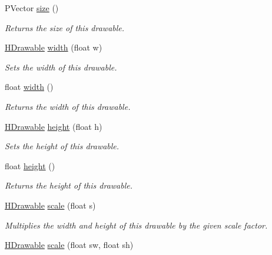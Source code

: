 \begin{DoxyCompactItemize}
P\-Vector \hyperlink{classhype_1_1core_1_1drawable_1_1_h_drawable_a91deb3e8a0b504c602670764733a744f}{size} ()
\begin{DoxyCompactList}\small\item\em Returns the size of this drawable. \end{DoxyCompactList}\item 
\hyperlink{classhype_1_1core_1_1drawable_1_1_h_drawable}{H\-Drawable} \hyperlink{classhype_1_1core_1_1drawable_1_1_h_drawable_ab77fd9fd384525f3d882a66cb7f006a5}{width} (float w)
\begin{DoxyCompactList}\small\item\em Sets the width of this drawable. \end{DoxyCompactList}\item 
float \hyperlink{classhype_1_1core_1_1drawable_1_1_h_drawable_a3c12eb4fa138e5a198ea1634cd2932ca}{width} ()
\begin{DoxyCompactList}\small\item\em Returns the width of this drawable. \end{DoxyCompactList}\item 
\hyperlink{classhype_1_1core_1_1drawable_1_1_h_drawable}{H\-Drawable} \hyperlink{classhype_1_1core_1_1drawable_1_1_h_drawable_ad361b8eaa72b4d79b0b62de0e2a2776d}{height} (float h)
\begin{DoxyCompactList}\small\item\em Sets the height of this drawable. \end{DoxyCompactList}\item 
float \hyperlink{classhype_1_1core_1_1drawable_1_1_h_drawable_a60c5ca2c8e2fc75fda7221cf4f74010b}{height} ()
\begin{DoxyCompactList}\small\item\em Returns the height of this drawable. \end{DoxyCompactList}\item 
\hyperlink{classhype_1_1core_1_1drawable_1_1_h_drawable}{H\-Drawable} \hyperlink{classhype_1_1core_1_1drawable_1_1_h_drawable_a64746f11d225482739741a694b23cea5}{scale} (float s)
\begin{DoxyCompactList}\small\item\em Multiplies the width and height of this drawable by the given scale factor. \end{DoxyCompactList}\item 
\hyperlink{classhype_1_1core_1_1drawable_1_1_h_drawable}{H\-Drawable} \hyperlink{classhype_1_1core_1_1drawable_1_1_h_drawable_adac661c14251dee5d5b9237fccbb5b16}{scale} (float sw, float sh)

\end{DoxyCompactItemize}
